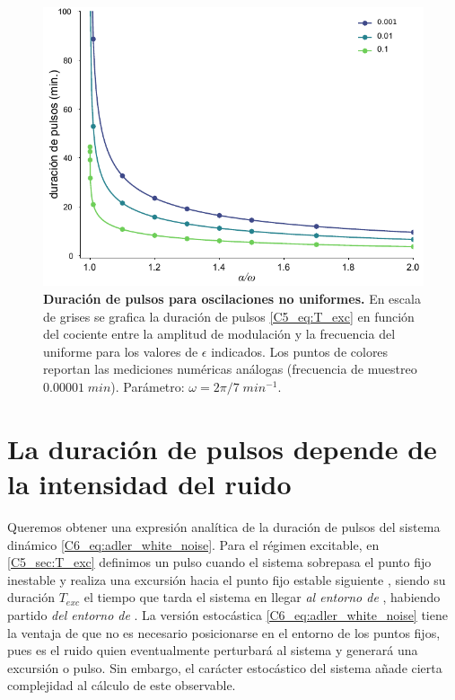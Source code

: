 { \begin{figure}
    \centering
    \includegraphics[width=1\columnwidth]{figures/chapter5/C5_T_exc.pdf} 
    \caption{\textbf{Duración de pulsos para oscilaciones no uniformes.} En escala de grises se grafica la duración de pulsos \ref{C5_eq:T_exc} en función del cociente entre la amplitud de modulación y la frecuencia del uniforme \ddelta para los valores de $\epsilon$ indicados. Los puntos de colores reportan las mediciones numéricas análogas (frecuencia de muestreo $0.00001\; min$). Parámetro: $\omega=2\pi/7\;min^{-1}$.}
    \label{C5_fig:T_exc_res}
\end{figure}



\section{La duración de pulsos depende de la intensidad del ruido}
\label{C6_sec:duracion}


Queremos obtener una expresión analítica de la duración de pulsos del sistema dinámico \ref{C6_eq:adler_white_noise}. Para el régimen excitable, en \ref{C5_sec:T_exc} definimos un pulso cuando el sistema sobrepasa el punto fijo inestable \xxi y realiza una excursión hacia el punto fijo estable siguiente \xxe, siendo su duración $T_{exc}$ el tiempo que tarda el sistema en llegar \emph{al entorno de} \xxe, habiendo partido \emph{del entorno de} \xxi. La versión estocástica \ref{C6_eq:adler_white_noise} tiene la ventaja de que no es necesario posicionarse en el entorno de los puntos fijos, pues es el ruido quien eventualmente perturbará al sistema y generará una excursión o pulso. Sin embargo, el carácter estocástico del sistema añade cierta complejidad al cálculo de este observable.

}
